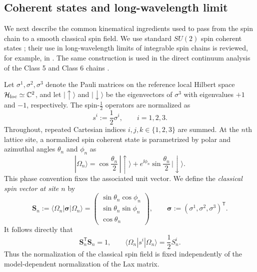 \subsection{Coherent states and long-wavelength limit}
\label{sec:coherent-long-wavelength}

We next describe the common kinematical ingredients used to pass from the
spin chain to a smooth classical spin field.  We use standard $SU(2)$ spin
coherent states \cite{Perelomov1986}; their use in long-wavelength limits of
integrable spin chains is reviewed, for example, in
\cite{AvanDoikouSfetsos2010}.  The same construction is used in the direct
continuum analysis of the Class 5 and Class 6 chains
\cite{deLeeuwFontanellaNietoGarcia2026}.

Let $\sigma^1,\sigma^2,\sigma^3$ denote the Pauli matrices on the reference
local Hilbert space $\mathcal H_{\rm loc}\simeq\mathbb C^2$, and let
$|\!\uparrow\rangle$ and $|\!\downarrow\rangle$ be the eigenvectors of
$\sigma^3$ with eigenvalues $+1$ and $-1$, respectively.  The spin-$\tfrac12$
operators are normalized as
\begin{equation}
s^i:=\frac12\sigma^i,
\qquad i=1,2,3.
\label{eq:spin-half-normalization}
\end{equation}
Throughout, repeated Cartesian indices $i,j,k\in\{1,2,3\}$ are summed.
At the $n$th lattice site, a normalized spin coherent state is parametrized by
polar and azimuthal angles $\theta_n$ and $\phi_n$ as
\begin{equation}
|\Omega_n\rangle
=
\cos\frac{\theta_n}{2}\,|\!\uparrow\rangle
+e^{\ii\phi_n}\sin\frac{\theta_n}{2}\,|\!\downarrow\rangle .
\label{eq:spin-coherent-state}
\end{equation}
This phase convention fixes the associated unit vector.  We define the
\emph{classical spin vector at site $n$} by
\begin{equation}
\boldsymbol S_n
:=
\langle\Omega_n|\boldsymbol\sigma|\Omega_n\rangle
=
\begin{pmatrix}
\sin\theta_n\cos\phi_n\\
\sin\theta_n\sin\phi_n\\
\cos\theta_n
\end{pmatrix},
\qquad
\boldsymbol\sigma:=(\sigma^1,\sigma^2,\sigma^3)^{\mathsf T}.
\label{eq:site-classical-spin}
\end{equation}
It follows directly that
\begin{equation}
\boldsymbol S_n^{\mathsf T}\boldsymbol S_n=1,
\qquad
\langle\Omega_n|s^i|\Omega_n\rangle
=\frac12 S_n^i.
\label{eq:spin-coherent-expectation}
\end{equation}
Thus the normalization of the classical spin field is fixed independently of
the model-dependent normalization of the Lax matrix.

